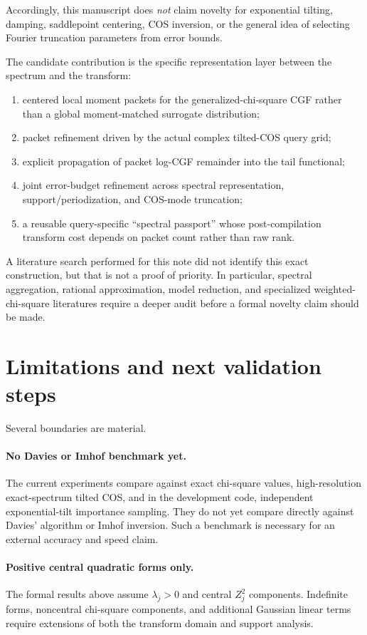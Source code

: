 \documentclass[11pt]{article}
\theoremstyle{definition}
\begin{document}
Accordingly, this manuscript does \emph{not} claim novelty for exponential tilting, damping, saddlepoint centering, COS inversion, or the general idea of selecting Fourier truncation parameters from error bounds.

The candidate contribution is the specific representation layer between the spectrum and the transform:
\begin{enumerate}[label=(\alph*)]
\item centered local moment packets for the generalized-chi-square CGF rather than a global moment-matched surrogate distribution;
\item packet refinement driven by the actual complex tilted-COS query grid;
\item explicit propagation of packet log-CGF remainder into the tail functional;
\item joint error-budget refinement across spectral representation, support/periodization, and COS-mode truncation;
\item a reusable query-specific ``spectral passport'' whose post-compilation transform cost depends on packet count rather than raw rank.
\end{enumerate}

A literature search performed for this note did not identify this exact construction, but that is not a proof of priority. In particular, spectral aggregation, rational approximation, model reduction, and specialized weighted-chi-square literatures require a deeper audit before a formal novelty claim should be made.

\section{Limitations and next validation steps}

Several boundaries are material.

\paragraph{No Davies or Imhof benchmark yet.}
The current experiments compare against exact chi-square values, high-resolution exact-spectrum tilted COS, and in the development code, independent exponential-tilt importance sampling. They do not yet compare directly against Davies' algorithm or Imhof inversion. Such a benchmark is necessary for an external accuracy and speed claim.

\paragraph{Positive central quadratic forms only.}
The formal results above assume $\lambda_j>0$ and central $Z_j^2$ components. Indefinite forms, noncentral chi-square components, and additional Gaussian linear terms require extensions of both the transform domain and support analysis.
\end{document}
